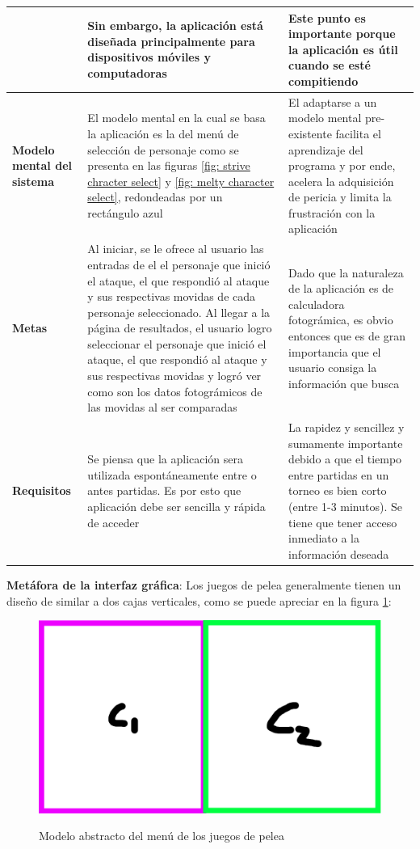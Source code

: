 \begin{tabularx}{\textwidth}{| X |  X |  X |}
    & Sin embargo, la aplicación está diseñada principalmente para dispositivos móviles y computadoras & Este punto es importante porque la aplicación es útil cuando se esté compitiendo\\
    \hline \textbf{Modelo mental del sistema} & El modelo mental en la cual se basa la aplicación es la del menú de selección de personaje como se presenta en las figuras \ref{fig: strive chracter select} y \ref{fig: melty character select}, redondeadas por un rectángulo azul & El adaptarse a un modelo mental pre-existente facilita el aprendizaje del programa y por ende, acelera la adquisición de pericia y limita la frustración con la aplicación  \\ 
    \hline \textbf{Metas} & Al iniciar, se le ofrece al usuario las entradas de el el personaje que inició el ataque, el que respondió al ataque y sus respectivas movidas de cada personaje seleccionado. Al llegar a la página de resultados, el usuario logro seleccionar el personaje que inició el ataque, el que respondió al ataque y sus respectivas movidas y logró ver como son los datos fotográmicos de las movidas al ser comparadas & Dado que la naturaleza de la aplicación es de calculadora fotográmica, es obvio entonces que es de gran importancia que el usuario consiga la información que busca \\ 
    \hline \textbf{Requisitos} & Se piensa que la aplicación sera utilizada espontáneamente entre o antes partidas. Es por esto que aplicación debe ser sencilla y rápida de acceder & La rapidez y sencillez y sumamente importante debido a que el tiempo entre partidas en un torneo es bien corto (entre 1-3 minutos). Se tiene que tener acceso inmediato a la información deseada\\ 
    \hline
\end{tabularx}

\textbf{Metáfora de la interfaz gráfica}: Los juegos de pelea generalmente tienen un diseño de similar a dos cajas verticales, como se puede apreciar en la figura \ref{fig: abstract model}:

\begin{figure}[ht!]
    \centering
    \caption{Modelo abstracto del menú de los juegos de pelea}
    \includegraphics[height=0.2\textwidth]{figures/abstract-design.jpg}
    \label{fig: abstract model}
\end{figure}

